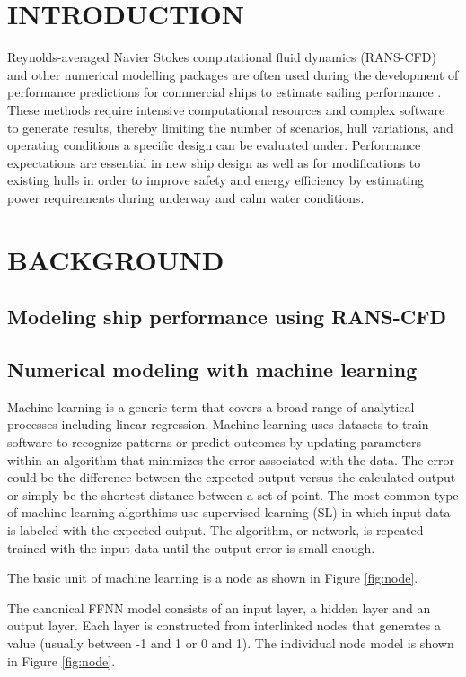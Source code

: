 \documentclass[10pt,a4paper,twocolumn]{article}
\begin{document}
\section{INTRODUCTION}
Reynolds-averaged Navier Stokes computational fluid dynamics (RANS-CFD) and other numerical modelling packages are often used during the development of performance predictions for commercial ships to estimate sailing performance \cite{Tezdogan2015}. These methods require intensive computational resources and complex software to generate results, thereby limiting the number of scenarios, hull variations, and operating conditions a specific design can be evaluated under. Performance expectations are essential in new ship design as well as for modifications to existing hulls in order to improve safety and energy efficiency   by estimating power requirements during underway and calm water conditions.

\section{BACKGROUND}

\subsection{Modeling ship performance using RANS-CFD}

\subsection{Numerical modeling with machine learning}

Machine learning is a generic term that covers a broad range of analytical processes including linear regression. Machine learning uses datasets to train software to recognize patterns or predict outcomes by updating parameters within an algorithm that minimizes the error associated with the data. The error could be the difference between the expected output versus the calculated output or simply be the shortest distance between a set of point. The most common type of machine learning algorthims use supervised learning (SL) in which input data is labeled with the expected output. The algorithm, or network, is repeated trained with the input data until the output error is small enough.

The basic unit of machine learning is a node as shown in  Figure \ref{fig:node}.

The canonical FFNN model consists of an input layer, a hidden layer and an output layer. Each layer is constructed from interlinked nodes that generates a value (usually between -1 and 1 or 0 and 1). The individual node model is shown in Figure \ref{fig:node}. \\
\end{document}

